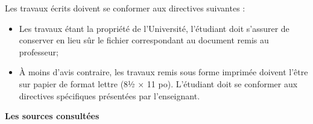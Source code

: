 \documentclass [12 pt]{article}
\begin{document}
            Les travaux écrits doivent se conformer aux directives suivantes :
            
        \begin{itemize}
        
                
        \item Les travaux étant la propriété de l'Université, l'étudiant doit s'assurer de
                    conserver en lieu sûr le fichier correspondant au document remis au
                    professeur;
                
        \item À moins d'avis contraire, les travaux remis sous forme imprimée doivent l'être
                    sur papier de format lettre (8½ × 11 po). L'étudiant doit se conformer aux
                    directives spécifiques présentées par l'enseignant.
            
        \end{itemize}
    
            
        \textbf{
        Les
                sources consultées
        }
    
\end{document}
